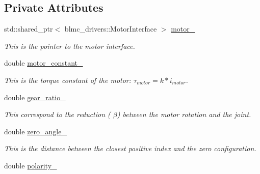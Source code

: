 \subsection*{Private Attributes}
\begin{DoxyCompactItemize}
\item 
std\+::shared\+\_\+ptr$<$ blmc\+\_\+drivers\+::\+Motor\+Interface $>$ \hyperlink{classblmc__robots_1_1BlmcJointModule_a0ff5ce1cb26ed04212914dc152ec0486}{motor\+\_\+}\hypertarget{classblmc__robots_1_1BlmcJointModule_a0ff5ce1cb26ed04212914dc152ec0486}{}\label{classblmc__robots_1_1BlmcJointModule_a0ff5ce1cb26ed04212914dc152ec0486}

\begin{DoxyCompactList}\small\item\em This is the pointer to the motor interface. \end{DoxyCompactList}\item 
double \hyperlink{classblmc__robots_1_1BlmcJointModule_a4e2e6f6cc7f0f7aed02efdca60394b40}{motor\+\_\+constant\+\_\+}\hypertarget{classblmc__robots_1_1BlmcJointModule_a4e2e6f6cc7f0f7aed02efdca60394b40}{}\label{classblmc__robots_1_1BlmcJointModule_a4e2e6f6cc7f0f7aed02efdca60394b40}

\begin{DoxyCompactList}\small\item\em This is the torque constant of the motor\+: $ \tau_{motor} = k * i_{motor} $. \end{DoxyCompactList}\item 
double \hyperlink{classblmc__robots_1_1BlmcJointModule_af013668d69e7cea2dcc21da8c1c9e4e6}{gear\+\_\+ratio\+\_\+}
\begin{DoxyCompactList}\small\item\em This correspond to the reduction ( $ \beta $) between the motor rotation and the joint. \end{DoxyCompactList}\item 
double \hyperlink{classblmc__robots_1_1BlmcJointModule_abdf774193a8ae31486e937eb432dc702}{zero\+\_\+angle\+\_\+}\hypertarget{classblmc__robots_1_1BlmcJointModule_abdf774193a8ae31486e937eb432dc702}{}\label{classblmc__robots_1_1BlmcJointModule_abdf774193a8ae31486e937eb432dc702}

\begin{DoxyCompactList}\small\item\em This is the distance between the closest positive index and the zero configuration. \end{DoxyCompactList}\item 
double \hyperlink{classblmc__robots_1_1BlmcJointModule_a6ec97901099ebcc3466851624c656f08}{polarity\+\_\+}\hypertarget{classblmc__robots_1_1BlmcJointModule_a6ec97901099ebcc3466851624c656f08}{}\label{classblmc__robots_1_1BlmcJointModule_a6ec97901099ebcc3466851624c656f08}


\end{DoxyCompactItemize}
